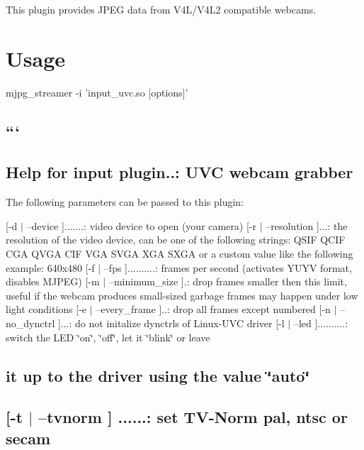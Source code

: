 This plugin provides J\+P\+E\+G data from V4\+L/\+V4\+L2 compatible webcams.

\section*{Usage }

\begin{DoxyVerb}mjpg_streamer -i 'input_uvc.so [options]'
\end{DoxyVerb}


\subsection*{``` }

\subsection*{Help for input plugin..\+: U\+V\+C webcam grabber }

The following parameters can be passed to this plugin\+:

\mbox{[}-\/d $\vert$ --device \mbox{]}.......\+: video device to open (your camera) \mbox{[}-\/r $\vert$ --resolution \mbox{]}...\+: the resolution of the video device, can be one of the following strings\+: Q\+S\+I\+F Q\+C\+I\+F C\+G\+A Q\+V\+G\+A C\+I\+F V\+G\+A S\+V\+G\+A X\+G\+A S\+X\+G\+A or a custom value like the following example\+: 640x480 \mbox{[}-\/f $\vert$ --fps \mbox{]}..........\+: frames per second (activates Y\+U\+Y\+V format, disables M\+J\+P\+E\+G) \mbox{[}-\/m $\vert$ --minimum\+\_\+size \mbox{]}.\+: drop frames smaller then this limit, useful if the webcam produces small-\/sized garbage frames may happen under low light conditions \mbox{[}-\/e $\vert$ --every\+\_\+frame \mbox{]}..\+: drop all frames except numbered \mbox{[}-\/n $\vert$ --no\+\_\+dynctrl \mbox{]}...\+: do not initalize dynctrls of Linux-\/\+U\+V\+C driver \mbox{[}-\/l $\vert$ --led \mbox{]}..........\+: switch the L\+E\+D \char`\"{}on\char`\"{}, \char`\"{}off\char`\"{}, let it \char`\"{}blink\char`\"{} or leave \subsection*{it up to the driver using the value \char`\"{}auto\char`\"{} }

\subsection*{\mbox{[}-\/t $\vert$ --tvnorm \mbox{]} ......\+: set T\+V-\/\+Norm pal, ntsc or secam }

